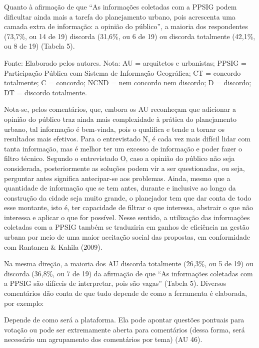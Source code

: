 \documentclass{article}
\begin{document}
Quanto à afirmação de que “As informações coletadas com a PPSIG podem
dificultar ainda mais a tarefa do planejamento urbano, pois acrescenta uma
camada extra de informação: a opinião do público”, a maioria dos
respondentes (73,7\%, ou 14 de 19) discorda (31,6\%, ou 6 de 19) ou discorda
totalmente (42,1\%, ou 8 de 19) (Tabela
5).

Fonte: Elaborado pelos autores. Nota: AU = arquitetos e urbanistas;
PPSIG = Participação Pública com Sistema de Informação Geográfica;
CT = concordo totalmente; C = concordo; NCND = nem concordo nem
discordo; D = discordo; DT = discordo totalmente.

Nota-se, pelos comentários, que, embora os AU reconheçam que adicionar a opinião
do público traz ainda mais complexidade à prática do planejamento urbano, tal
informação é bem-vinda, pois o qualifica e tende a tornar os resultados mais
efetivos. Para o entrevistado N, é cada vez mais difícil lidar com tanta
informação, mas é melhor ter um excesso de informação e poder fazer o filtro
técnico. Segundo o entrevistado O, caso a opinião do público não seja
considerada, posteriormente as soluções podem vir a ser questionadas, ou seja,
perguntar antes significa antecipar-se aos problemas. Ainda, mesmo que a
quantidade de informação que se tem antes, durante e inclusive ao longo da
construção da cidade seja muito grande, o planejador tem que dar conta de todo
esse montante, isto é, ter capacidade de filtrar o que interessa, abstrair o que
não interessa e aplicar o que for possível. Nesse sentido, a utilização das
informações coletadas com a PPSIG também se traduziria em ganhos de eficiência
na gestão urbana por meio de uma maior aceitação social das propostas, em
conformidade com Rantanen \& Kahila
(2009).

Na mesma direção, a maioria dos AU discorda totalmente (26,3\%, ou 5 de 19) ou
discorda (36,8\%, ou 7 de 19) da afirmação de que “As informações
coletadas com a PPSIG são difíceis de interpretar, pois são vagas”
(Tabela 5). Diversos comentários dão
conta de que tudo depende de como a ferramenta é elaborada, por exemplo:

Depende de como será a plataforma. Ela pode apontar questões pontuais para
votação ou pode ser extremamente aberta para comentários (dessa forma, será
necessário um agrupamento dos comentários por tema) (AU
46).
\end{document}
